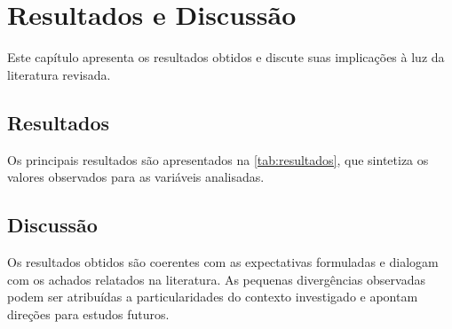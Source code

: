 \chapter{Resultados e Discussão}
\label{cap:resultados-e-discussao}


Este capítulo apresenta os resultados obtidos e discute suas implicações à luz da literatura revisada.

\section{Resultados}
\label{sec:resultados}

Os principais resultados são apresentados na \autoref{tab:resultados}, que sintetiza os valores observados para as variáveis analisadas.

\begin{table}[!htbp]
    \centering
\end{table}

\section{Discussão}
\label{sec:discussao}

Os resultados obtidos são coerentes com as expectativas formuladas e dialogam com os achados relatados na literatura. As pequenas divergências observadas podem ser atribuídas a particularidades do contexto investigado e apontam direções para estudos futuros.
